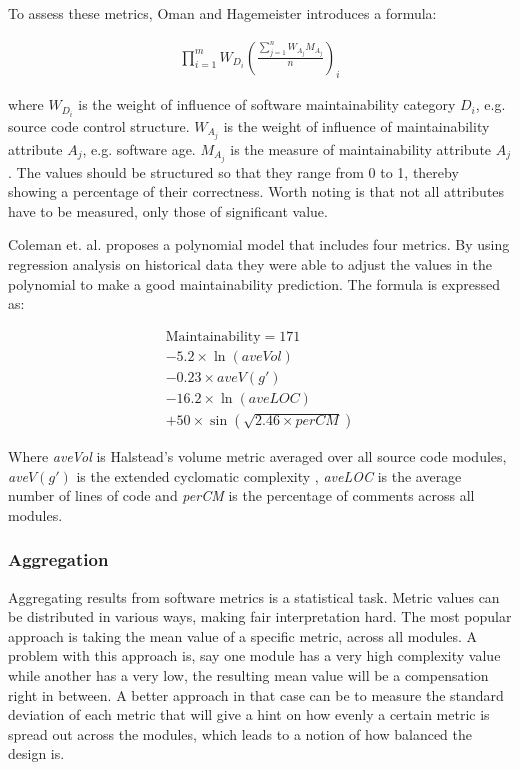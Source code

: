To assess these metrics, Oman and Hagemeister introduces a formula:

\begin{align*}
\prod_{i=1}^m{W_D_i(\frac{\sum_{j=1}^n{W_A_jM_A_j}}{n})_i}
\end{align*}

where $W_D_i$ is the weight of influence of software maintainability category
$D_i$, e.g.  source code control structure. $W_A_j$ is the weight of influence
of maintainability attribute $A_j$, e.g. software age. $M_A_j$ is the measure
of maintainability attribute $A_j$. The values should be structured so that
they range from 0 to 1, thereby showing a percentage of their correctness.
Worth noting is that not all attributes have to be measured, only those of
significant value. \cite{oman1992metrics}

Coleman et. al. \cite{coleman1994using} proposes a polynomial model that
includes four metrics. By using regression analysis  on historical data they were able to adjust the values in
the polynomial to make a good maintainability prediction. The formula is
expressed as:

\begin{align*}
\text{Maintainability} = 171 \\
  - 5.2 \times \ln(\textit{aveVol}) \\
  - 0.23 \times \textit{ave$V(g')$} \\
  - 16.2 \times \ln(\textit{aveLOC}) \\
  + 50 \times \sin(\sqrt{2.46 \times \textit{perCM}})
\end{align*}

Where \textit{aveVol} is Halstead's volume metric averaged over all source code
modules, \textit{ave$V(g')$} is the extended cyclomatic complexity , \textit{aveLOC} is the average number
of lines of code and \textit{perCM} is the percentage of comments across all
modules. \cite{coleman1994using}

\subsubsection{Aggregation}

Aggregating results from software metrics is a statistical task. Metric values
can be distributed in various ways, making fair interpretation hard. The most
popular approach is taking the mean value of a specific metric, across all
modules. A problem with this approach is, say one module has a very high
complexity value while another has a very low, the resulting mean value will be
a compensation right in between. A better approach in that case can be to
measure the standard deviation of each metric that will give a hint on how
evenly a certain metric is spread out across the modules, which leads to a
notion of how balanced the design is. \cite{benestad2006assessing}

